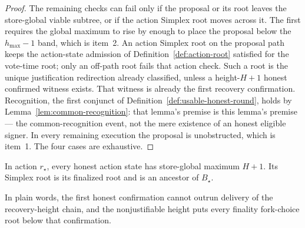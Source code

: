 \begin{proof}
The remaining checks can fail only if the proposal or its root leaves the
store-global viable subtree, or if the action Simplex root moves across it.
The first requires the global maximum to rise by enough to place the
proposal below the \(h_{\max}-1\) band, which is item~2.  An action Simplex
root on the proposal path keeps the action-state admission of
Definition~\ref{def:action-root} satisfied for the vote-time root; only
an off-path root fails that action
check.  Such a root is the unique justification redirection already
classified, unless a
height-\(H+1\) honest confirmed witness exists.  That witness is already the
first recovery confirmation.  Recognition, the first conjunct of
Definition~\ref{def:usable-honest-round}, holds by
Lemma~\ref{lem:common-recognition}: that lemma's premise is this
lemma's premise --- the common-recognition event, not the mere existence
of an honest eligible signer.  In every remaining execution the proposal
is unobstructed, which is item~1.  The four cases are exhaustive.

\end{proof}



\begin{lemma}
\label{lem:first-confirmation-simplex-roots}
In action \(r_\star\), every honest action state has store-global maximum
\(H+1\).  Its Simplex root is its finalized root and is an ancestor of
\(B_\star\).

In plain words, the first honest confirmation cannot outrun delivery of the
recovery-height chain, and the nonjustifiable height puts every finality
fork-choice root below that confirmation.
\end{lemma}

